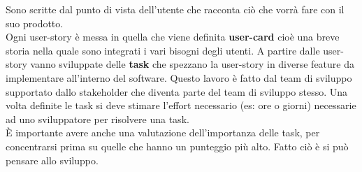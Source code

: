 Sono scritte dal punto di vista dell'utente che racconta ciò che vorrà fare con il suo prodotto.\\
Ogni user-story è messa in quella che viene definita \textbf{user-card} cioè una breve storia nella quale sono integrati i vari bisogni degli utenti.
A partire dalle user-story vanno sviluppate delle \textbf{task} che spezzano la user-story in diverse feature da implementare all'interno del software.
Questo lavoro è fatto dal team di sviluppo supportato dallo stakeholder che diventa parte del team di sviluppo stesso.
Una volta definite le task si deve stimare l'effort necessario (es: ore o giorni) necessarie ad uno sviluppatore per risolvere una task.\\
È importante avere anche una valutazione dell'importanza delle task, per concentrarsi prima su quelle che hanno un punteggio più alto.
Fatto ciò è si può pensare allo sviluppo.

